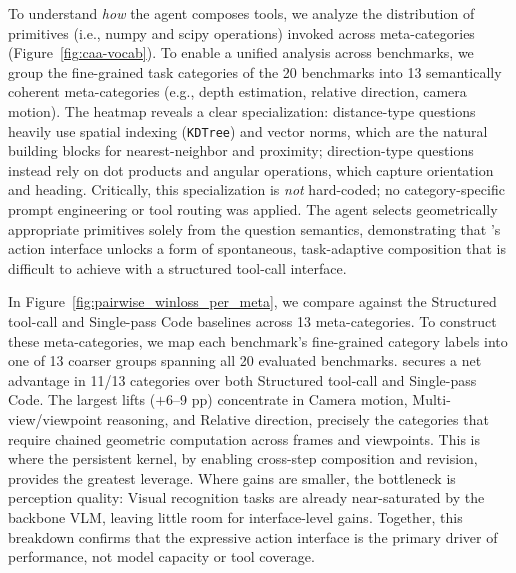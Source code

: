 To understand \emph{how} the agent composes tools, we analyze the distribution of primitives (i.e., numpy and scipy operations) invoked across meta-categories (Figure~\ref{fig:caa-vocab}). 
To enable a unified analysis across benchmarks, we group the fine-grained task categories of the 20 benchmarks into 13 semantically coherent meta-categories (e.g., depth estimation, relative direction, camera motion). 
The heatmap reveals a clear specialization: distance-type questions heavily use spatial indexing (\texttt{KDTree}) and vector norms, which are the natural building blocks for nearest-neighbor and proximity; direction-type questions instead rely on dot products and angular operations, which capture orientation and heading. Critically, this specialization is \emph{not} hard-coded; no category-specific prompt engineering or tool routing was applied. The agent selects geometrically appropriate primitives solely from the question semantics, demonstrating that \ours{}'s action interface unlocks a form of spontaneous, task-adaptive composition that is difficult to achieve with a structured tool-call interface.






In Figure~\ref{fig:pairwise_winloss_per_meta}, we compare \ours{} against the Structured tool-call and Single-pass Code baselines across 13 meta-categories. 
To construct these meta-categories, we map each benchmark's fine-grained category labels into one of 13 coarser groups spanning all 20 evaluated benchmarks.
\ours{} secures a net advantage in 11/13 categories over both Structured tool-call and Single-pass Code. 
The largest lifts ($+$6--9 pp) concentrate in Camera motion, Multi-view/viewpoint reasoning, and Relative direction, precisely the categories that require chained geometric computation across frames and viewpoints. This is where the persistent kernel, by enabling cross-step composition and revision, provides the greatest leverage. Where gains are smaller, the bottleneck is perception quality: Visual recognition tasks are already near-saturated by the backbone VLM, leaving little room for interface-level gains. Together, this breakdown confirms that the expressive action interface is the primary driver of performance, not model capacity or tool coverage.





















